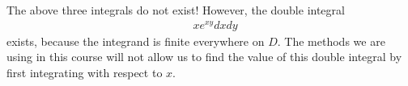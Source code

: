 \documentclass{article}
\begin{document}
The above three integrals do not exist! However, the double integral 
\begin{align*} 
  \mathop{\int_0^1 \!\!\! \int_0^1} xe^{xy} dxdy 
\end{align*}
exists, because the integrand is finite everywhere on $D$. The methods we are using in this course will not allow us to find the value of this double integral by first integrating with respect to $x$.

\EEN %
\end{document}
